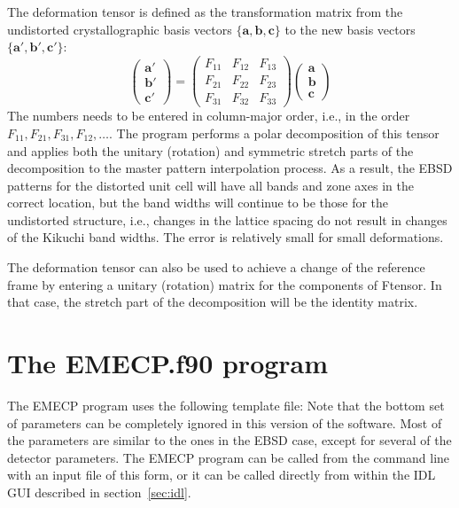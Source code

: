 \documentclass[DIV=calc, paper=letter, fontsize=11pt]{scrartcl}	 %
\begin{document}
\begin{enumerate}
	The deformation tensor is defined as the transformation matrix from the undistorted crystallographic basis vectors $\{\mathbf{a},\mathbf{b},\mathbf{c}\}$ 
	to the new basis vectors $\{\mathbf{a}',\mathbf{b}',\mathbf{c}'\}$:
	\[
		\left(\begin{array}{c}
		\mathbf{a}'\\
		\mathbf{b}'\\
		\mathbf{c}'\end{array}\right) = \left(\begin{array}{ccc}
		F_{11} & F_{12} & F_{13}\\
		F_{21} & F_{22} & F_{23}\\
		F_{31} & F_{32} & F_{33}\end{array}\right) \left(\begin{array}{c}
		\mathbf{a}\\
		\mathbf{b}\\
		\mathbf{c}\end{array}\right) 
	\]
	The numbers needs to be entered in column-major order, i.e., in the order $F_{11}, F_{21}, F_{31}, F_{12}, \ldots$.  The program performs a polar decomposition
	of this tensor and applies both the unitary (rotation) and symmetric stretch parts of the decomposition to the master pattern interpolation process.  As a result,
	the EBSD patterns for the distorted unit cell will have all bands and zone axes in the correct location, but the band widths will continue to be those for the undistorted
	structure, i.e., changes in the lattice spacing do not result in changes of the Kikuchi band widths.  The error is relatively small for small deformations.
	
	The deformation tensor can also be used to achieve a change of the reference frame by entering a unitary (rotation) matrix for the components of \textsf{Ftensor}. In that
	case, the stretch part of the decomposition will be the identity matrix.
\end{enumerate}



\section{The \protect\textsf{EMECP.f90} program\label{sec:f90ECP}}
The \textsf{EMECP} program uses the following template file:
Note that the bottom set of parameters can be completely ignored in this version of the software.  Most of the parameters 
are similar to the ones in the EBSD case, except for several of the detector parameters.  The \textsf{EMECP} program
can be called from the command line with an input file of this form, or it can be called directly from within the IDL GUI
described in section~\ref{sec:idl}.  
\end{document}
